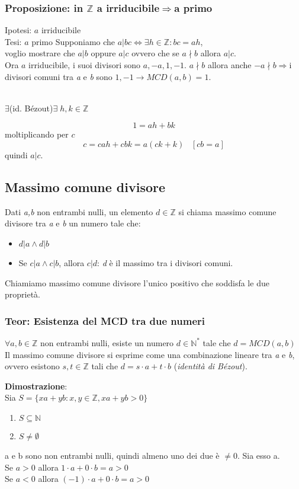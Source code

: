 \subsubsection{Proposizione: in \(\mathbb{Z}\) a irriducibile\(\Rightarrow\)a primo}
Ipotesi: \(a\) irriducibile
\\
Tesi: \(a\) primo
Supponiamo che \(a|bc\Leftrightarrow\exists h\in\mathbb{Z}:bc=ah\),
\\
voglio mostrare che \(a|b\) oppure \(a|c\) ovvero che se \(a\nmid b\) allora \(a|c\).
\\
Ora \(a\) irriducibile, i suoi divisori sono \(a,-a,1,-1\). \(a\nmid b\) allora anche \(-a\nmid b\Rightarrow\)i divisori comuni tra \textit{a} e \textit{b} sono \(1,-1\rightarrow MCD(a,b)=1\).
\\\\
\centerline{\(\exists\)(id. Bézout)\(\exists\; h,k\in\mathbb{Z}\)}
\[1=ah+bk\]
moltiplicando per \(c\)
\[c=cah+cbk=a(ck+k)\;\;\;[cb=a]\]
quindi \(a|c\).

\subsection{Massimo comune divisore}
Dati \textit{a,b} non entrambi nulli, un elemento \(d\in\mathbb{Z}\) si chiama massimo comune divisore tra \textit{a} e \textit{b} un numero tale che:
\begin{itemize}
    \item \(d|a \land d|b\)
    \item Se \(c|a \land c|b\), allora \(c|d\): \textit{d} è il massimo tra i divisori comuni.
\end{itemize}
Chiamiamo massimo comune divisore l'unico positivo che soddisfa le due proprietà.

\subsubsection{Teor: Esistenza del MCD tra due numeri}
\(\forall a,b\in\mathbb{Z}\) non entrambi nulli, esiste un numero \(d\in\mathbb{N^*}\) tale che \(d=MCD(a,b)\)
\\
Il massimo comune divisore si esprime come una combinazione lineare tra \textit{a} e \textit{b}, ovvero esistono \(s, t\in\mathbb{Z}\) tali che \(d=s\cdot a+t\cdot b\) (\textit{identità di Bézout}).

\textbf{Dimostrazione}:
\\
Sia \(S=\{xa+yb:x,y\in\mathbb{Z}, xa+yb>0\}\)
\begin{enumerate}
    \item \(S\subseteq\mathbb{N}\)
    \item \(S\neq\emptyset\)
\end{enumerate}
a e b sono non entrambi nulli, quindi almeno uno dei due è \(\neq 0\).
Sia esso a.
\\
Se \(a>0\) allora \(1\cdot a+0\cdot b=a>0\)
\\Se \(a<0\) allora \((-1)\cdot a+0\cdot b=a>0\)

